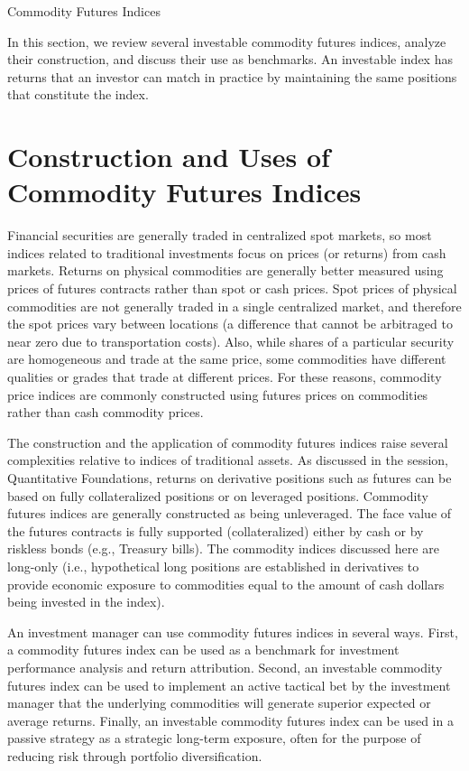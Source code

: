 \documentclass[11pt]{article}
\begin{document}
Commodity Futures Indices

In this section, we review several investable commodity futures indices, analyze their construction, and discuss their use as benchmarks. An investable index has returns that an investor can match in practice by maintaining the same positions that constitute the index.

\section*{Construction and Uses of Commodity Futures Indices}
Financial securities are generally traded in centralized spot markets, so most indices related to traditional investments focus on prices (or returns) from cash markets. Returns on physical commodities are generally better measured using prices of futures contracts rather than spot or cash prices. Spot prices of physical commodities are not generally traded in a single centralized market, and therefore the spot prices vary between locations (a difference that cannot be arbitraged to near zero due to transportation costs). Also, while shares of a particular security are homogeneous and trade at the same price, some commodities have different qualities or grades that trade at different prices. For these reasons, commodity price indices are commonly constructed using futures prices on commodities rather than cash commodity prices.

The construction and the application of commodity futures indices raise several complexities relative to indices of traditional assets. As discussed in the session, Quantitative Foundations, returns on derivative positions such as futures can be based on fully collateralized positions or on leveraged positions. Commodity futures indices are generally constructed as being unleveraged. The face value of the futures contracts is fully supported (collateralized) either by cash or by riskless bonds (e.g., Treasury bills). The commodity indices discussed here are long-only (i.e., hypothetical long positions are established in derivatives to provide economic exposure to commodities equal to the amount of cash dollars being invested in the index).

An investment manager can use commodity futures indices in several ways. First, a commodity futures index can be used as a benchmark for investment performance analysis and return attribution. Second, an investable commodity futures index can be used to implement an active tactical bet by the investment manager that the underlying commodities will generate superior expected or average returns. Finally, an investable commodity futures index can be used in a passive strategy as a strategic long-term exposure, often for the purpose of reducing risk through portfolio diversification.
\end{document}
